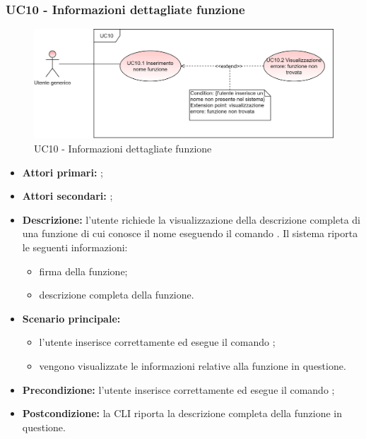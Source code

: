 \subsubsection{UC10 - Informazioni dettagliate funzione}
\begin{figure}[h]
	\centering
	\includegraphics[scale=\ucs]{./res/img/UC10.png}
	\caption {UC10 - Informazioni dettagliate funzione}
\end{figure}
\begin{itemize}
	\item \textbf{Attori primari:} \ua{};
	\item \textbf{Attori secondari:} \re{};
	\item \textbf{Descrizione:} l’utente richiede la visualizzazione della descrizione completa di una funzione di cui conosce il nome eseguendo il comando \pinfo{}. Il sistema riporta le seguenti informazioni:  
	\begin{itemize}
		\item firma della funzione;
		\item descrizione completa della funzione.
	\end{itemize} 
	\item \textbf{Scenario principale:} 
	\begin{itemize}
		\item l'utente inserisce correttamente ed esegue il comando \pinfo{}; 
		\item vengono visualizzate le informazioni relative alla funzione in questione.
	\end{itemize}
	\item \textbf{Precondizione:} l'utente inserisce correttamente ed esegue il comando \info{};
	\item \textbf{Postcondizione:} la CLI riporta la descrizione completa della funzione in questione.
\end{itemize}